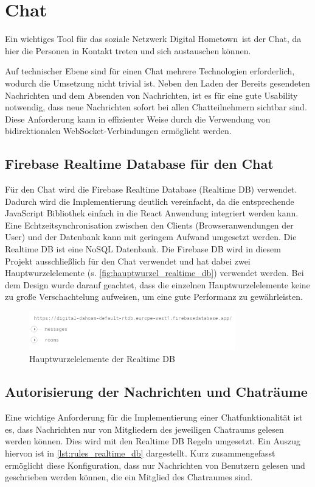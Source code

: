 \section{Chat}
\label{sec:chat}

Ein wichtiges Tool für das soziale Netzwerk \glqq Digital Hometown\grqq \ ist der Chat, da hier die Personen in Kontakt treten und sich austauschen können.

Auf technischer Ebene sind für einen Chat mehrere Technologien erforderlich, wodurch die Umsetzung nicht trivial ist. Neben den Laden der Bereits gesendeten Nachrichten und dem Absenden von Nachrichten, ist es für eine gute Usability notwendig, dass neue Nachrichten sofort bei allen Chatteilnehmern sichtbar sind. Diese Anforderung kann in effizienter Weise durch die Verwendung von bidirektionalen WebSocket-Verbindungen ermöglicht werden.

\subsection{Firebase Realtime Database für den Chat}
\label{sec:firebase_realtime_db_chat}

Für den Chat wird die Firebase Realtime Database (Realtime DB) verwendet. Dadurch wird die Implementierung deutlich vereinfacht, da die entsprechende JavaScript Bibliothek einfach in die React Anwendung integriert werden kann. Eine Echtzeitsynchronisation zwischen den Clients (Browseranwendungen der User) und der Datenbank kann mit geringem Aufwand umgesetzt werden. Die Realtime DB ist eine NoSQL Datenbank.
Die Firebase DB wird in diesem Projekt ausschließlich für den Chat verwendet und hat dabei zwei Hauptwurzelelemente (s. \autoref{fig:hauptwurzel_realtime_db}) verwendet werden. Bei dem Design wurde darauf geachtet, dass die einzelnen Hauptwurzelelemente keine zu große Verschachtelung aufweisen, um eine gute Performanz zu gewährleisten.

\begin{figure}[!htb]
  \centering
  \includegraphics[width=0.8\textwidth]{figures/boas/21_hauptwurzel_realtime_db.png}
  \caption[]{Hauptwurzelelemente der Realtime DB}
  \label{fig:hauptwurzel_realtime_db}
\end{figure}


\subsection{Autorisierung der Nachrichten und Chaträume}
\label{sec:autorisierung_chat}
Eine wichtige Anforderung für die Implementierung einer Chatfunktionalität ist es, dass Nachrichten nur von Mitgliedern des jeweiligen Chatraums gelesen werden können. Dies wird mit den Realtime DB Regeln umgesetzt. Ein Auszug hiervon ist in \autoref{lst:rules_realtime_db} dargestellt. Kurz zusammengefasst ermöglicht diese Konfiguration, dass nur Nachrichten von Benutzern gelesen und geschrieben werden können, die ein Mitglied des Chatraumes sind.

